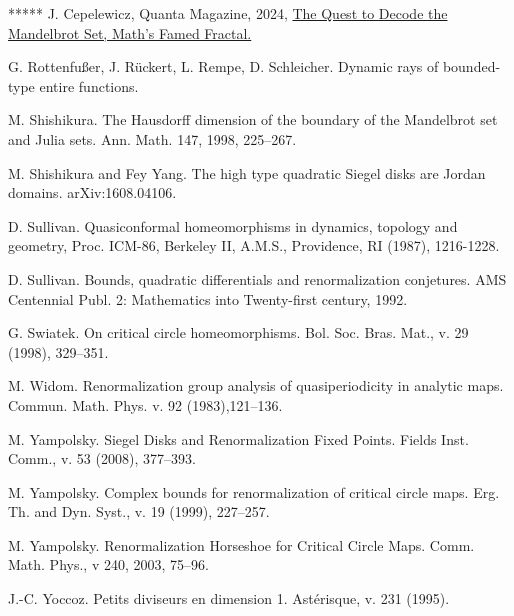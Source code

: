\documentclass{amsart}
\newcommand{\1}{{\mathbb 1 }}
\theoremstyle{remark}
\numberwithin{equation}{section}
\theoremstyle{definition}
\begin{document}
\begin{thebibliography}{*****}
 J. Cepelewicz, Quanta Magazine, 2024, \href{https://www.quantamagazine.org/the-quest-to-decode-the-mandelbrot-set-maths-famed-fractal-20240126/}{The Quest to Decode the Mandelbrot Set, Math’s Famed Fractal.}


 G. Rottenfu{\ss}er, J. R{\"u}ckert, L. Rempe, D. Schleicher. Dynamic rays of bounded-type entire functions.

 M. Shishikura. The Hausdorff dimension of the boundary of the Mandelbrot set and Julia sets. Ann. Math. 147, 1998, 225--267.

 M. Shishikura and Fey Yang. The high type quadratic Siegel disks are Jordan domains. arXiv:1608.04106.



 D. Sullivan. Quasiconformal homeomorphisms in dynamics, topology and geometry, Proc. ICM-86, Berkeley II, A.M.S., Providence, RI (1987), 1216-1228.

  D. Sullivan. Bounds, quadratic differentials and renormalization conjetures.
  AMS Centennial Publ. 2: Mathematics into Twenty-first century, 1992.   


 G. Swiatek. On critical circle homeomorphisms. Bol. Soc. Bras. Mat., v. 29 (1998), 329--351.







 M. Widom. Renormalization group analysis of quasiperiodicity in analytic maps. Commun. Math. Phys. v. 92 (1983),121--136.



 M. Yampolsky.  Siegel Disks and Renormalization Fixed Points.
  Fields Inst. Comm., v. 53 (2008), 377--393.  


 M. Yampolsky. Complex bounds for
  renormalization of critical circle maps. Erg. Th. and Dyn. Syst.,
  v. 19 (1999), 227--257. 
  
  
   M. Yampolsky. Renormalization Horseshoe for Critical Circle Maps. Comm. Math. Phys., v 240, 2003, 75--96.

 J.-C. Yoccoz. Petits diviseurs en dimension 1. Ast\'erisque, v. 231 (1995).



\end{thebibliography}
\end{document}
